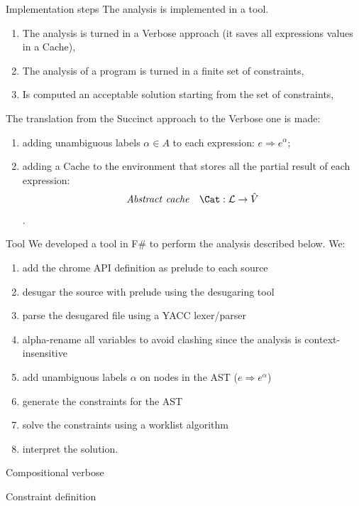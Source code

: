\documentclass[11pt]{beamer}
\begin{document}
\begin{frame}{Implementation steps}
The analysis is implemented in a tool.
\begin{enumerate}
\item The analysis is turned in a Verbose approach (it saves all expressions values in a Cache),
\item The analysis of a program is turned in a finite set of constraints,
\item Is computed an acceptable solution starting from the set of constraints,
\end{enumerate}
The translation from the Succinct approach to the Verbose one is made:
\begin{enumerate}
\item adding unambiguous labels $\alpha \in A$ to each expression: $e \Rightarrow e^\alpha$;
\item adding a Cache to the environment that stores all the partial result of each expression: 
$$\mathit{Abstract\ cache} \quad \Cat : \labs \rightarrow \absvalues$$.
\end{enumerate}  
\end{frame}

\begin{frame}{Tool}
We developed a tool in F\# to perform the analysis described below. We:
\begin{enumerate}
\item add the chrome API definition as prelude to each source
\item desugar the source with prelude using the desugaring tool \cite{LambdaJS}
\item parse the desugared file using a YACC lexer/parser
\item alpha-rename all variables to avoid clashing since the analysis is context-insensitive
\item add unambiguous labels $\alpha$ on nodes in the AST ($e \Rightarrow e^\alpha$)
\item generate the constraints for the AST
\item solve the constraints using a worklist algorithm
\item interpret the solution.
\end{enumerate}
\end{frame}

\begin{frame}{Compositional verbose}

\end{frame}

\begin{frame}{Constraint definition}

\end{frame}
\end{document}
